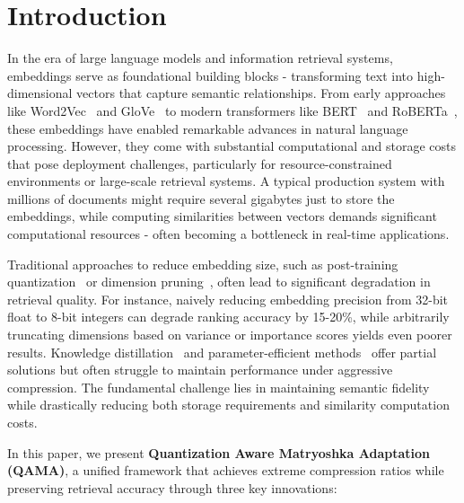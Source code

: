 \section{Introduction}

In the era of large language models and information retrieval systems, embeddings serve as foundational building blocks - transforming text into high-dimensional vectors that capture semantic relationships. From early approaches like Word2Vec~\cite{mikolov2013distributed} and GloVe~\cite{pennington2014glove} to modern transformers like BERT~\cite{devlin2019bert} and RoBERTa~\cite{liu2019roberta}, these embeddings have enabled remarkable advances in natural language processing. However, they come with substantial computational and storage costs that pose deployment challenges, particularly for resource-constrained environments or large-scale retrieval systems. A typical production system with millions of documents might require several gigabytes just to store the embeddings, while computing similarities between vectors demands significant computational resources - often becoming a bottleneck in real-time applications.

Traditional approaches to reduce embedding size, such as post-training quantization~\cite{jacob2018quantization} or dimension pruning~\cite{li2016pruning}, often lead to significant degradation in retrieval quality. For instance, naively reducing embedding precision from 32-bit float to 8-bit integers can degrade ranking accuracy by 15-20\%, while arbitrarily truncating dimensions based on variance or importance scores yields even poorer results. Knowledge distillation~\cite{hinton2015distilling} and parameter-efficient methods~\cite{houlsby2019parameter} offer partial solutions but often struggle to maintain performance under aggressive compression. The fundamental challenge lies in maintaining semantic fidelity while drastically reducing both storage requirements and similarity computation costs.

In this paper, we present \textbf{Quantization Aware Matryoshka Adaptation (QAMA)}, a unified framework that achieves extreme compression ratios while preserving retrieval accuracy through three key innovations:

